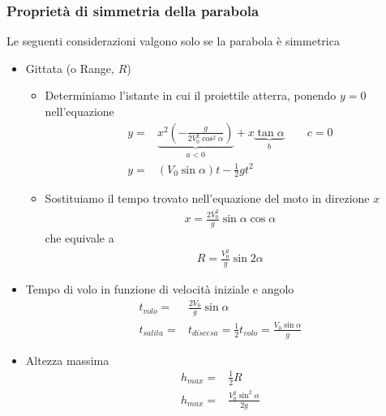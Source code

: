 \documentclass[../main.tex]{subfiles}
\begin{document}
\subsubsection{Proprietà di simmetria della parabola}
Le seguenti considerazioni valgono solo se la parabola è simmetrica
\begin{itemize}
    \item Gittata (o Range, $R$)
    \begin{itemize}
        \item Determiniamo l'istante in cui il proiettile atterra, ponendo $y=0$ nell'equazione \begin{align*}
            y =& \underbrace{x^2(-\frac{g}{2V_0^2\cos^2\alpha}) }_{a<0} + x \underbrace{\tan\alpha }_{b} \phantom{--} c = 0 \\
            y =& (V_0 \sin\alpha)t-\frac{1}{2}gt^2
        \end{align*}
        \item Sostituiamo il tempo trovato nell'equazione del moto in direzione $x$ \begin{align*}
            x = \frac{2V_0^2}{g}\sin\alpha\cos\alpha
        \end{align*}
        che equivale a \begin{align*}
            R = \frac{V_0^2}{g}\sin 2 \alpha
        \end{align*}
    \end{itemize}
    \item Tempo di volo in funzione di velocità iniziale e angolo \begin{align*}
        t_{volo} =& \frac{2V_0}{g}\sin\alpha \\
        t_{salita} =& t_{discesa} = \frac{1}{2} t_{volo} = \frac{V_0 \sin \alpha}{g}
    \end{align*}
    \item Altezza massima \begin{align*}
        h_{max} =& \frac{1}{2}R \\
        h_{max} =& \frac{V_0^2\sin^2 \alpha}{2g}
    \end{align*}
\end{itemize}
\end{document}
